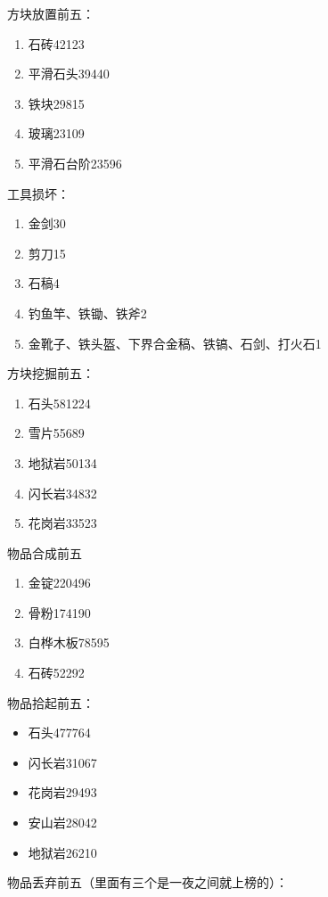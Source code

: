 \documentclass[openany]{book}
\theoremstyle{remark}\newtheorem*{remark}{Remark}
\begin{document}
	方块放置前五：
	
	\begin{enumerate}
		\item 石砖42123
		\item 平滑石头39440
		\item 铁块29815
		\item 玻璃23109
		\item 平滑石台阶23596
	\end{enumerate}
	
	工具损坏：
	
	\begin{enumerate}
		\item 金剑30
		\item 剪刀15
		\item 石稿4
		\item 钓鱼竿、铁锄、铁斧2
		\item 金靴子、铁头盔、下界合金稿、铁镐、石剑、打火石1
	\end{enumerate}
	
	方块挖掘前五：
	
	\begin{enumerate}
		\item 石头581224
		\item 雪片55689
		\item 地狱岩50134
		\item 闪长岩34832
		\item 花岗岩33523
	\end{enumerate}
	
	物品合成前五
	
	\begin{enumerate}
		\item 金锭220496
		\item 骨粉174190
		\item 白桦木板78595
		\item 石砖52292
	\end{enumerate}
	
	物品拾起前五：
	
	\begin{itemize}
		\item 石头477764
		\item 闪长岩31067
		\item 花岗岩29493
		\item 安山岩28042
		\item 地狱岩26210
	\end{itemize}
	
	物品丢弃前五（里面有三个是一夜之间就上榜的）：
	
\end{document}
